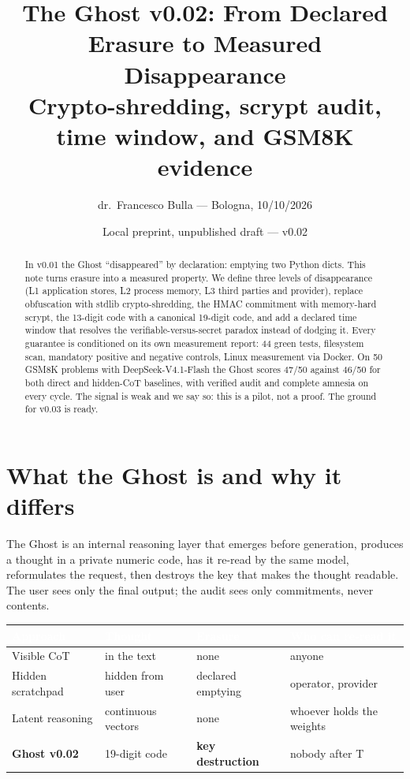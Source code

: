 \documentclass[11pt,a4paper]{article}
\title{\textcolor{ghostblue}{The Ghost v0.02: From Declared Erasure to Measured Disappearance}\\ \large Crypto-shredding, scrypt audit, time window, and GSM8K evidence}
\author{dr.\ Francesco Bulla --- Bologna, 10/10/2026}
\date{Local preprint, unpublished draft --- v0.02}
\begin{document}
\maketitle

\begin{abstract}
In v0.01 the Ghost ``disappeared'' by declaration: emptying two Python dicts.
This note turns erasure into a measured property. We define three levels of
disappearance (L1 application stores, L2 process memory, L3 third parties and
provider), replace obfuscation with stdlib crypto-shredding, the HMAC commitment
with memory-hard scrypt, the 13-digit code with a canonical 19-digit code, and add
a declared time window that resolves the verifiable-versus-secret paradox instead
of dodging it. Every guarantee is conditioned on its own measurement report:
44 green tests, filesystem scan, mandatory positive and negative controls,
Linux measurement via Docker. On 50 GSM8K problems with DeepSeek-V4.1-Flash the
Ghost scores 47/50 against 46/50 for both direct and hidden-CoT baselines, with
verified audit and complete amnesia on every cycle. The signal is weak and we say
so: this is a pilot, not a proof. The ground for v0.03 is ready.
\end{abstract}

\section{What the Ghost is and why it differs}
The Ghost is an internal reasoning layer that emerges before generation, produces
a thought in a private numeric code, has it re-read by the same model, reformulates
the request, then destroys the key that makes the thought readable. The user sees
only the final output; the audit sees only commitments, never contents.

\begin{center}
\begin{tabular}{llll}
\rowcolor{ghostblue}\textcolor{white}{Approach} & \textcolor{white}{Thought} & \textcolor{white}{Erasure} & \textcolor{white}{Who can re-read it} \\
\midrule
Visible CoT & in the text & none & anyone \\
Hidden scratchpad & hidden from user & declared emptying & operator, provider \\
Latent reasoning & continuous vectors & none & whoever holds the weights \\
\rowcolor{palegreen}\textbf{Ghost v0.02} & 19-digit code & \textbf{key destruction} & nobody after T \\
\bottomrule
\end{tabular}
\end{center}
\end{document}
